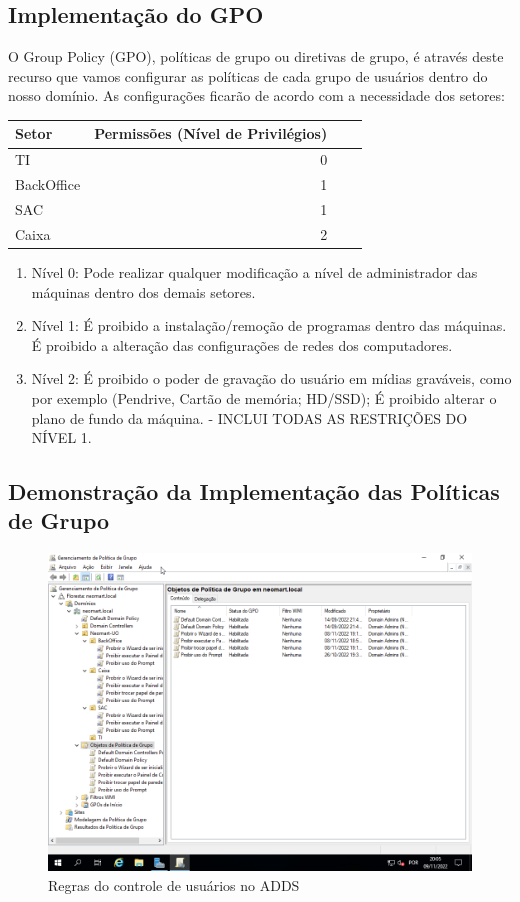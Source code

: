 \documentclass[12pt]{article}
\begin{document}
\subsection{Implementação do GPO}
O Group Policy (GPO), políticas de grupo ou diretivas de grupo, é através deste recurso que vamos configurar as políticas de cada grupo de usuários dentro do nosso domínio. As configurações ficarão de acordo com a necessidade dos setores:

\begin{center}
\begin{tabular}{| l | r | r | r |}
\hline
Setor & Permissões (Nível de Privilégios)\\
\hline
TI & 0\\
BackOffice & 1\\
SAC & 1\\
Caixa & 2\\ 
\hline
\end{tabular}
\end{center}

\begin{enumerate}
    \item Nível 0: Pode realizar qualquer modificação a nível de administrador das máquinas dentro dos demais setores.
    \item Nível 1: É proibido a instalação/remoção de programas dentro das máquinas. É proibido a alteração das configurações de redes dos computadores.
    \item Nível 2: É proibido o poder de gravação do usuário em mídias graváveis, como por exemplo (Pendrive, Cartão de memória; HD/SSD); É proibido alterar o plano de fundo da máquina. - INCLUI TODAS AS RESTRIÇÕES DO NÍVEL 1.
\end{enumerate}

\subsection{Demonstração da Implementação das Políticas de Grupo}

\begin{figure}[ht]
\centering
\includegraphics[height=0.5\textwidth]{adds-regras.png}
\caption{Regras do controle de usuários no ADDS}
\label{fig:adds-pastas}
\end{figure}
\end{document}
